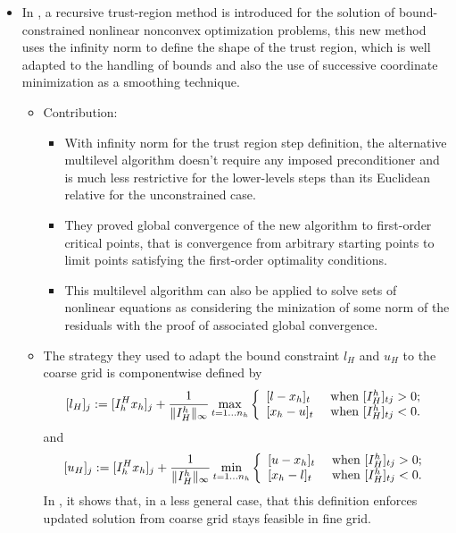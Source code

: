 \documentclass{article}
\begin{document}
\begin{itemize}
\item In \cite{m2}, a recursive trust-region method is introduced for the solution of bound-constrained nonlinear nonconvex optimization problems, this new method uses the infinity norm to define the shape of the trust region, which is well adapted to the handling of bounds and also the use of successive coordinate minimization as a smoothing technique.
\begin{itemize}
\item Contribution: 
\begin{itemize}
\item With infinity norm for the trust region step definition, the alternative multilevel algorithm doesn't require any imposed preconditioner and is much less restrictive for the lower-levels steps than its Euclidean relative for the unconstrained case. 
\item They proved global convergence of the new algorithm to first-order critical points, that is convergence from arbitrary starting points to limit points satisfying the first-order optimality conditions. 
\item This multilevel algorithm can also be applied to solve sets of nonlinear equations as considering the minization of some norm of the residuals with the proof of associated global convergence.  
\end{itemize}
\item The strategy they used to adapt the bound constraint $l_{H}$ and $u_{H}$ to the coarse grid is componentwise defined by
\[ [l_H]_j := [I_h^{H} x_{h}]_j +\frac{1}{\|I_H^{h}\|_{\infty}}\max_{t=1\dots n_h} \left\{ \begin{array}{ll}
                                                                                                                                          [l-x_h]_t   &  \mbox{ when $[I_H^h]_{tj}>0$}; \\ {[x_h-u]_t}  &  \mbox{ when $ [I_H^h]_{tj}<0$}.
 \end{array} \right. \]
and
\[ [u_H]_j := [I_h^{H} x_{h}]_j +\frac{1}{\|I_H^{h}\|_{\infty}}\min_{t=1\dots n_h} \left\{ \begin{array}{ll}
                                                                                                                                         [u-x_h]_t   &  \mbox{ when $[I_H^h]_{tj}>0$}; \\ {[x_h-l]_t}  &  \mbox{ when $ [I_H^h]_{tj}<0$}.
 \end{array} \right. \]
In \cite{ej1}, it shows that, in a less general case, that this definition enforces updated solution from coarse grid stays feasible in fine grid. 


\end{itemize}
\end{itemize}
\end{document}
